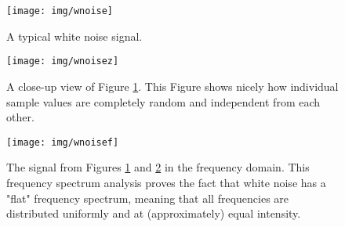 

\begin{figure}[h!]
	\texttt{[image: img/wnoise]}
	\caption{A typical white noise signal.}
	\label{fig:wnoise}
\end{figure}

\begin{figure}[h!]
	\texttt{[image: img/wnoisez]}
	\caption{A close-up view of Figure \ref{fig:wnoise}. This Figure shows nicely how individual sample values are completely random and independent from each other. }
	\label{fig:wnoisez}
\end{figure}

\begin{figure}[p!]
  \texttt{[image: img/wnoisef]}
  \caption{The signal from Figures \ref{fig:wnoise} and \ref{fig:wnoisez} in the frequency domain. This frequency spectrum analysis proves the fact that white noise has a "flat" frequency spectrum, meaning that all frequencies are  distributed uniformly and at (approximately) equal intensity. }
  \label{fig:wnoisefreq}
\end{figure}

\begin{table}[p!]
  \caption{A simple C++ class to produce white noise. \texttt{rgen\_} is a random number generator following the Mersenne-Twister algorithm, to retrieve uniformly distributed values from the \texttt{dist\_} distribution in the range of -1 to 1. \texttt{tick()} returns a random white noise sample. }
  \label{code:wnoise}
\end{table}
